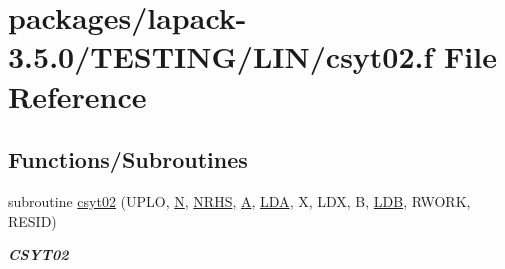 \hypertarget{csyt02_8f}{}\section{packages/lapack-\/3.5.0/\+T\+E\+S\+T\+I\+N\+G/\+L\+I\+N/csyt02.f File Reference}
\label{csyt02_8f}
\subsection*{Functions/\+Subroutines}
\begin{DoxyCompactItemize}
\item 
subroutine \hyperlink{group__complex__lin_gaf4cd31b18e43b28fad005cbfdb370e56}{csyt02} (U\+P\+L\+O, \hyperlink{polmisc_8c_a0240ac851181b84ac374872dc5434ee4}{N}, \hyperlink{example__user_8c_aa0138da002ce2a90360df2f521eb3198}{N\+R\+H\+S}, \hyperlink{classA}{A}, \hyperlink{example__user_8c_ae946da542ce0db94dced19b2ecefd1aa}{L\+D\+A}, X, L\+D\+X, B, \hyperlink{example__user_8c_a50e90a7104df172b5a89a06c47fcca04}{L\+D\+B}, R\+W\+O\+R\+K, R\+E\+S\+I\+D)
\begin{DoxyCompactList}\small\item\em {\bfseries C\+S\+Y\+T02} \end{DoxyCompactList}\end{DoxyCompactItemize}
